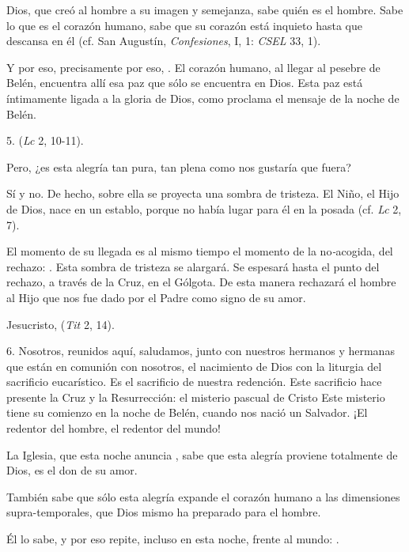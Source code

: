 \begin{body}
	Dios, que creó al hombre a su imagen y semejanza, sabe quién es el hombre. Sabe lo que es el corazón humano, sabe que su corazón está inquieto hasta que descansa en él (cf. San Augustín, \emph{Confesiones}, I, 1: \emph{CSEL} 33, 1).
	
	Y por eso, precisamente por eso, . El corazón humano, al llegar al pesebre de Belén, encuentra allí esa paz que sólo se encuentra en Dios. Esta paz está íntimamente ligada a la gloria de Dios, como proclama el mensaje de la noche de Belén.
	
	5.  (\emph{Lc} 2, 10-11).
	
	Pero, ¿es esta alegría tan pura, tan plena como nos gustaría que fuera?
	
	Sí y no. De hecho, sobre ella se proyecta una sombra de tristeza. El Niño, el Hijo de Dios, nace en un establo, porque no había lugar para él en la posada (cf. \emph{Lc} 2, 7).
	
	El momento de su llegada es al mismo tiempo el momento de la no\emph{-}acogida, del rechazo: . Esta sombra de tristeza se alargará. Se espesará hasta el punto del rechazo, a través de la Cruz, en el Gólgota. De esta manera rechazará el hombre al Hijo que nos fue dado por el Padre como signo de su amor.
	
	Jesucristo,  (\emph{Tit} 2, 14).
	
	6. Nosotros, reunidos aquí, saludamos, junto con nuestros hermanos y hermanas que están en comunión con nosotros, el nacimiento de Dios con la liturgia del sacrificio eucarístico. Es el sacrificio de nuestra redención. Este sacrificio hace presente la Cruz y la Resurrección: el misterio pascual de Cristo Este misterio tiene su comienzo en la noche de Belén, cuando nos nació un Salvador. ¡El redentor del hombre, el redentor del mundo!
	
	La Iglesia, que esta noche anuncia , sabe que esta alegría proviene totalmente de Dios, es el don de su amor.
	
	También sabe que sólo esta alegría expande el corazón humano a las dimensiones supra-temporales, que Dios mismo ha preparado para el hombre.
	
	Él lo sabe, y por eso repite, incluso en esta noche, frente al mundo: .
\end{body}

